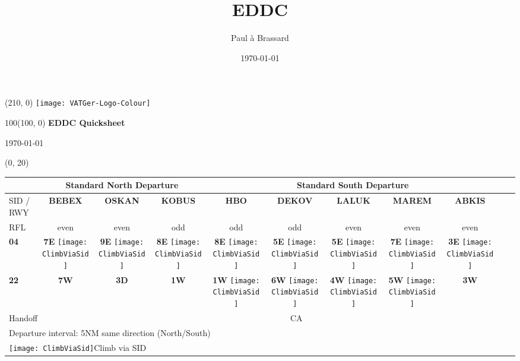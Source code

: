 \documentclass[10pt,landscape,a4paper]{article}
\title{EDDC}
\author{Paul à Brassard}
\date{\today}
\newcommand{\x}{\texttt{[image: ClimbViaSid]}}
\begin{document}
\setlength\extrarowheight{1pt}

\setlength{\TPHorizModule}{1mm}
\setlength{\TPVertModule}{\TPHorizModule}
\textblockorigin{7mm}{12mm}

\begin{textblock}{2}(210, 0)
  \texttt{[image: VATGer-Logo-Colour]}
\end{textblock}


\begin{textblock}{100}(100, 0)
  \large
  \centering
  \textbf{EDDC Quicksheet}

  \today
\end{textblock}


\begin{textblock}{30}(0, 20)
\begin{table}
\begin{tabular}{|l|c|c|c||c|c|c|c|c|c|l|}
\multicolumn{1}{l}{} & \multicolumn{3}{c}{\textbf{Standard North Departure}} & \multicolumn{5}{c}{\textbf{Standard South Departure}}    \\ \hline
SID / RWY 	& \textbf{BEBEX} & \textbf{OSKAN} & \textbf{KOBUS} & \textbf{HBO} & \textbf{DEKOV} & \textbf{LALUK} & \textbf{MAREM} & \textbf{ABKIS} & \multirow{6}{*}{\rotatebox{90}{\textbf{FL70}}} \\
RFL 		& even & even & odd & odd & odd & even & even & even & \\	
\textbf{04}	& \textbf{7E} \x & \textbf{9E} \x & \textbf{8E} \x & \textbf{8E} \x & \textbf{5E} \x & \textbf{5E} \x & \textbf{7E} \x & \textbf{3E} \x & \\ \cline{0-8}
\textbf{22}	& \textbf{7W} & \textbf{3D} & \textbf{1W} & \textbf{1W} \x & \textbf{6W} \x & \textbf{4W} \x & \textbf{5W} \x & \textbf{3W} & \\ \hline

\multicolumn{2}{|l}{Handoff} & \multicolumn{7}{c|}{CA} \\ \cline{0-8}
\multicolumn{8}{l}{Departure interval: 5NM same direction (North/South)} \\
\multicolumn{8}{l}{\x \color{red}Climb via SID} \\
\end{tabular}
\end{table}
\end{textblock}
\end{document}
